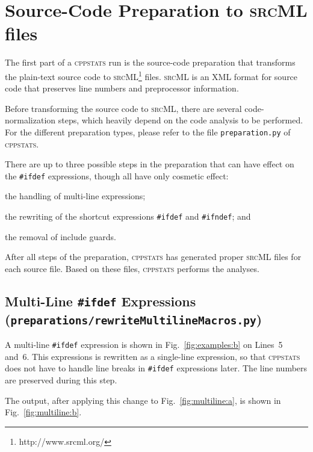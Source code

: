 \documentclass[a4paper]{scrartcl}
\newcommand\code[1]{\texttt{#1}}
\newcommand\tool[1]{\textsc{#1}}
\newcommand\ifdeff[1]{\code{\##1}\xspace}
\newcommand\ifdef[0]{{\upshape\ifdeff{ifdef}}\xspace}
\newcommand\cppstats[0]{\tool{cppstats}\xspace}
\begin{document}
\section{Source-Code Preparation to \tool{srcML} files}
\label{sec:preparation}

The first part of a \cppstats run is the source-code preparation that transforms the plain-text source code to \tool{srcML}\footnote{http://www.srcml.org/} files.
\tool{srcML} is an XML format for source code that preserves line numbers and preprocessor information.

Before transforming the source code to \tool{srcML}, there are several code-normalization steps, which heavily depend on the code analysis to be performed.
For the different preparation types, please refer to the file \code{preparation.py} of \cppstats.

There are up to three possible steps in the preparation that can have effect on the \ifdef expressions, though all have only cosmetic effect:
\begin{inparaenum}[\itshape 1\upshape)]
\item the handling of multi-line expressions;
\item the rewriting of the shortcut expressions \ifdeff{ifdef} and \ifdeff{ifndef}; and
\item the removal of include guards.
\end{inparaenum}

After all steps of the preparation, \cppstats has generated proper \tool{srcML} files for each source file.
Based on these files, \cppstats performs the analyses.


\subsection{Multi-Line \ifdef Expressions {\footnotesize (\code{preparations/rewriteMultilineMacros.py})}}

A multi-line \ifdef expression is shown in Fig.\ \ref{fig:examples:b} on Lines~5 and~6.
This expressions is rewritten as a single-line expression, so that \cppstats does not have to handle line breaks in \ifdef expressions later.
The line numbers are preserved during this step.

The output, after applying this change to Fig.\ \ref{fig:multiline:a}, is shown in Fig.\ \ref{fig:multiline:b}.
\end{document}
